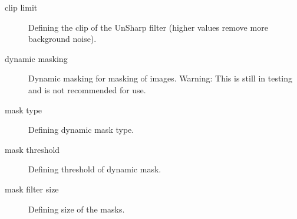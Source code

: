\documentclass[letterpaper,10pt,english]{sphinxmanual}
\begin{document}
\begin{description}
\item[{clip limit}] \leavevmode
Defining the clip of the UnSharp filter (higher values remove more background noise).

\item[{dynamic masking}] \leavevmode
Dynamic masking for masking of images. 
Warning: This is still in testing and is not recommended for use.

\item[{mask type}] \leavevmode
Defining dynamic mask type.

\item[{mask threshold}] \leavevmode
Defining threshold of dynamic mask.

\item[{mask filter size}] \leavevmode
Defining size of the masks.

\end{description}
\end{document}
